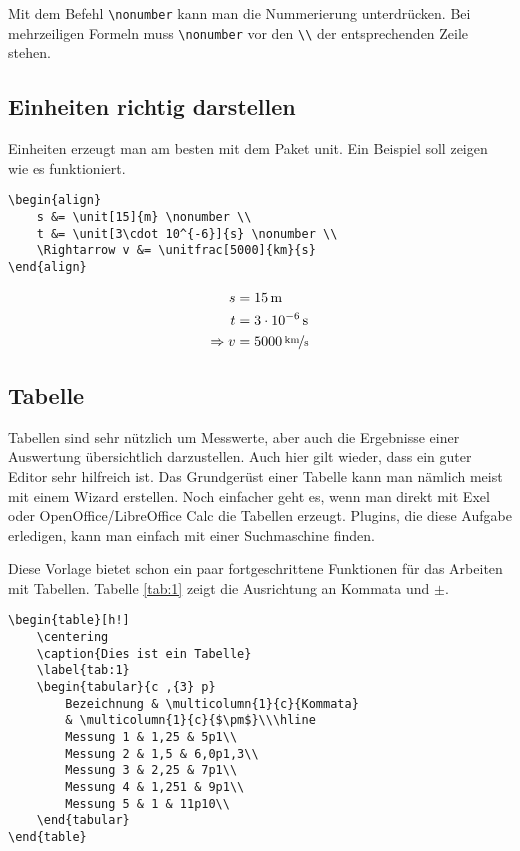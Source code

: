 Mit dem Befehl \verb+\nonumber+ kann man die Nummerierung unterdrücken. Bei mehrzeiligen Formeln muss \verb+\nonumber+ vor den \verb+\\+ der entsprechenden Zeile stehen.

\subsection{Einheiten richtig darstellen}

Einheiten erzeugt man am besten mit dem Paket unit. Ein Beispiel soll zeigen wie es funktioniert.

\begin{verbatim}
\begin{align}
    s &= \unit[15]{m} \nonumber \\
    t &= \unit[3\cdot 10^{-6}]{s} \nonumber \\
    \Rightarrow v &= \unitfrac[5000]{km}{s}
\end{align}
\end{verbatim}

\begin{align}
    s &= \unit[15]{m} \nonumber \\
    t &= \unit[3\cdot 10^{-6}]{s} \nonumber \\
    \Rightarrow v &= \unitfrac[5000]{km}{s}
\end{align}

\subsection{Tabelle}

Tabellen sind sehr nützlich um Messwerte, aber auch die Ergebnisse einer Auswertung übersichtlich darzustellen. Auch hier gilt wieder, dass ein guter Editor sehr hilfreich ist. Das Grundgerüst einer Tabelle kann man nämlich meist mit einem Wizard erstellen. Noch einfacher geht es, wenn man direkt mit Exel oder OpenOffice/LibreOffice Calc die Tabellen erzeugt. Plugins, die diese Aufgabe erledigen, kann man einfach mit einer Suchmaschine finden.

Diese Vorlage bietet schon ein paar fortgeschrittene Funktionen für das Arbeiten mit Tabellen. Tabelle \ref{tab:1} zeigt die Ausrichtung an Kommata und $\pm$.

\begin{verbatim}
\begin{table}[h!]
    \centering
    \caption{Dies ist ein Tabelle}
    \label{tab:1}
    \begin{tabular}{c ,{3} p}
        Bezeichnung & \multicolumn{1}{c}{Kommata}
        & \multicolumn{1}{c}{$\pm$}\\\hline
        Messung 1 & 1,25 & 5p1\\
        Messung 2 & 1,5 & 6,0p1,3\\
        Messung 3 & 2,25 & 7p1\\
        Messung 4 & 1,251 & 9p1\\
        Messung 5 & 1 & 11p10\\
    \end{tabular}
\end{table}
\end{verbatim}

